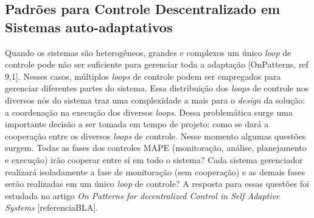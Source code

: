 \documentclass[conference]{IEEEtran}
\begin{document}
\subsection{Padrões para Controle Descentralizado em Sistemas auto-adaptativos}
Quando os sistemas são heterogêneos, grandes e complexos um único \textit{loop} de controle pode não ser suficiente para gerenciar toda a adaptação [OnPatterns, ref 9,1]. Nesses casos, múltiplos \textit{loops} de controle podem ser empregados para gerenciar diferentes partes do sistema. Essa distribuição dos \textit{loops} de controle nos diversos nós do sistema traz uma complexidade a mais para o \textit{design }da solução: a coordenação na execução dos diversos \textit{loops}. Dessa problemática surge uma importante decisão a ser tomada em tempo de projeto: como se dará a cooperação entre os diversos \textit{loops} de controle. Nesse momento algumas questões surgem. Todas as fases dos controles MAPE (monitoração, análise, planejamento e execução) irão cooperar entre sí em todo o sistema? Cada sistema gerenciador realizará isoladamente a fase de monitoração (sem cooperação) e as demais fases serão realizadas em um único \textit{loop} de controle? A resposta para essas questões foi estudada no artigo \textit{On Patterns for decentralized Control in Self Adaptive Systems} [referenciaBLA].
\end{document}
